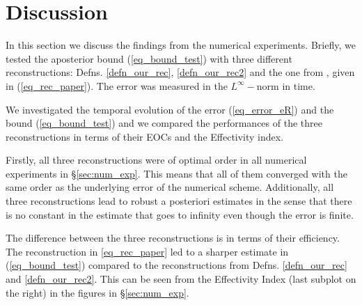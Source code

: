 \documentclass[12pt,a4paper]{article}
\numberwithin{equation}{section}
\theoremstyle{definition}
\begin{document}
\section{Discussion}\label{sec:discussion}
In this section we discuss the findings from the numerical experiments.  Briefly, we tested the aposterior bound (\ref{eq_bound_test}) with three different reconstructions: Defns. \ref{defn_our_rec}, \ref{defn_our_rec2} and the one from \cite{georgoulis2016posteriori}, given in (\ref{eq_rec_paper}).  The error was measured in the $L^{\infty}-$norm in time. 

 We investigated the temporal evolution of the error (\ref{eq_error_eR})  and the bound (\ref{eq_bound_test}) and we compared the performances of the three reconstructions in terms of their EOCs and the Effectivity index.

Firstly,  all three reconstructions were of optimal order in all numerical experiments in \S \ref{sec:num_exp}. This means that all of them converged with the same order as the underlying error of the numerical scheme.  
Additionally, all three reconstructions lead to robust a posteriori estimates in the sense that there is no constant in the estimate that goes to infinity even though the error is finite.

The difference between the three reconstructions is in terms of their efficiency.  The reconstruction in \ref{eq_rec_paper} led to a sharper estimate in (\ref{eq_bound_test}) compared to the reconstructions from Defns. \ref{defn_our_rec} and \ref{defn_our_rec2}.  This can be seen from the Effectivity Index (last subplot on the right) in the figures in \S\ref{sec:num_exp}.




\end{document}
